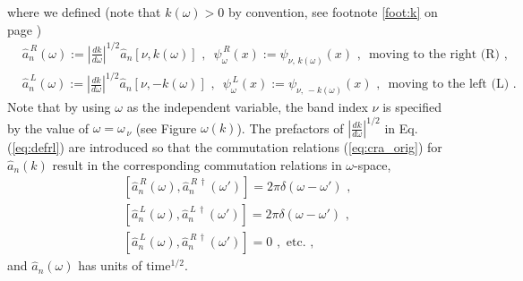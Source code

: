 %
where we defined (note that $k(\omega)>0$ by convention, see footnote \ref{foot:k} on page \pageref{foot:k})
%
\begin{subequations} \label{eq:defrl}
\begin{eqnarray}
& \hat{a}_n^{\,R}(\omega) := \displaystyle{\left| \frac{d k}{d \omega} \right|^{1/2}} \hat{a}_n\left[ \nu, k(\omega) \right] \, \, , 
\, \, \, \psi_{\omega}^{\,R}(x) := \psi_{\nu,\,k(\omega)}(x) \, \, , \, \, \,  \text{moving to the right (R)} \, \, , \\[2mm]
& \hat{a}_n^{\,L}(\omega) := \displaystyle{\left| \frac{d k}{d \omega} \right|^{1/2}} \hat{a}_n\left[ \nu, - k(\omega) \right] \, \, , 
\, \, \, \psi_{\omega}^{\,L}(x) := \psi_{\nu,\,-k(\omega)}(x) \, \, , \, \, \,  \text{moving to the left (L)} \, \, .
\end{eqnarray}
\end{subequations}
%
%
\color{red} Note that by using $\omega$ as the independent variable, the band index $\nu$ is 
specified by the value of $\omega = \omega_{\,\nu}$ (see Figure $\omega(k)$). \color{black} 
%
The prefactors of $\displaystyle{\left| \frac{d k}{d \omega} \right|^{1/2}}$ 
in Eq.\,(\ref{eq:defrl})
are introduced so that 
the commutation relations (\ref{eq:cra_orig}) for $\hat{a}_n(k)$ result in the corresponding
commutation relations in $\omega$-space,
%
\begin{subequations} \label{eq:cra_omega}
\begin{eqnarray}
    & \left[ \hat{a}_n^{\,R}(\omega),{\hat a}_n^{\,R \, \dagger}(\omega') \right] = 2 \pi \delta(\omega - \omega') \, \, , \\[1mm]
    & \left[ \hat{a}_n^{\,L}(\omega),{\hat a}_n^{\,L \, \dagger}(\omega') \right] = 2 \pi \delta(\omega - \omega') \, \, , \\[1mm]
    & \left[ \hat{a}_n^{\,L}(\omega),{\hat a}_n^{\,R \, \dagger}(\omega') \right] = 0 \, \, , \, \, \text{etc.} \, \, ,
\end{eqnarray}
\end{subequations}
%
and $\hat{a}_n(\omega)$ has units of $\text{time}^{1/2}$.

